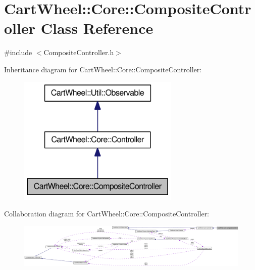 \hypertarget{classCartWheel_1_1Core_1_1CompositeController}{
\section{CartWheel::Core::CompositeController Class Reference}
\label{classCartWheel_1_1Core_1_1CompositeController}
}


{\ttfamily \#include $<$CompositeController.h$>$}



Inheritance diagram for CartWheel::Core::CompositeController:\nopagebreak
\begin{figure}[H]
\begin{center}
\leavevmode
\includegraphics[width=218pt]{classCartWheel_1_1Core_1_1CompositeController__inherit__graph}
\end{center}
\end{figure}


Collaboration diagram for CartWheel::Core::CompositeController:\nopagebreak
\begin{figure}[H]
\begin{center}
\leavevmode
\includegraphics[width=400pt]{classCartWheel_1_1Core_1_1CompositeController__coll__graph}
\end{center}
\end{figure}
